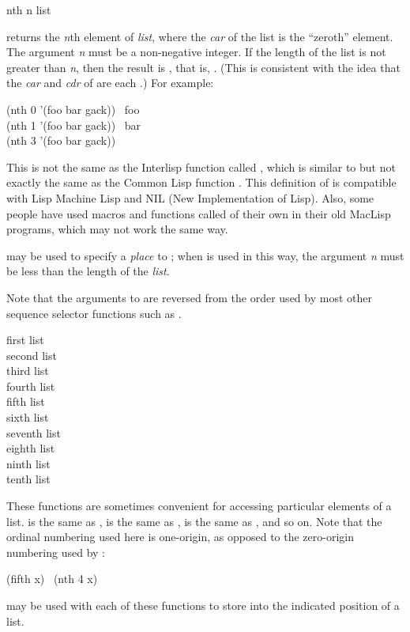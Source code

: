 \begin{defun}[Function]
nth n list

 returns the {\it n}th element of {\it list}, where
the {\it car} of the list is the ``zeroth'' element.
The argument {\it n} must be a non-negative integer.
If the length of the list is not greater than {\it n}, then the result
is {\empty}, that is, {\false}.
(This is consistent with the idea that the {\it car} and {\it cdr}
of {\empty} are each {\empty}.)
For example:
\begin{lisp}
(nth 0 '(foo bar gack)) \EV\ foo \\
(nth 1 '(foo bar gack)) \EV\ bar \\
(nth 3 '(foo bar gack)) \EV\ {\empty}
\end{lisp}

\beforenoterule
\begin{incompatibility}
This is not
the same as the Interlisp function called ,
which is similar to but not exactly the same as the Common Lisp function
.  This definition of  is compatible
with Lisp Machine Lisp and NIL (New Implementation of Lisp).
Also, some people have used macros and functions called  of their own in
their old MacLisp programs, which may not work the same way.
\end{incompatibility}
\afternoterule

 may be used to specify a {\it place} to ;
when  is used in this way, the argument {\it n} must be less
than the length of the {\it list}.

Note that the arguments to  are reversed from the order
used by most other sequence selector functions such as .
\end{defun}


\begin{defun}[Function]
first list \\
second list \\
third list \\
fourth list \\
fifth list \\
sixth list \\
seventh list \\
eighth list \\
ninth list \\
tenth list

These functions are sometimes convenient for accessing particular
elements of a list.   is the same as ,
 is the same as ,  is the
same as , and so on.
Note that the ordinal numbering used here is one-origin,
as opposed to the zero-origin numbering used by :
\begin{lisp}
(fifth x) \EQ\ (nth 4 x)
\end{lisp}

 may be used with each of these functions to store
into the indicated position of a list.
\end{defun}

